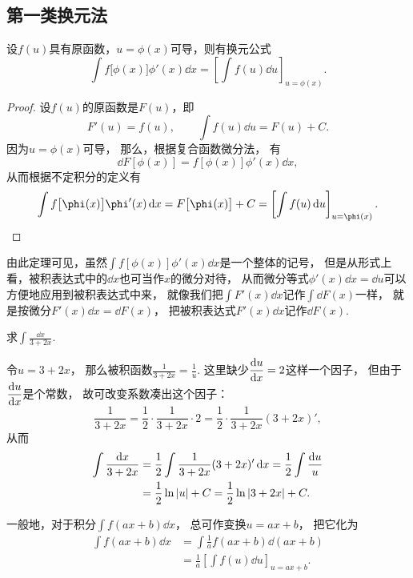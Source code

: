 \subsection{第一类换元法}
\begin{theorem}
设\(f(u)\)具有原函数，\(u=\phi(x)\)可导，则有换元公式\[
	\int f\bigl[\phi(x)\bigr] \phi'(x) \dd{x}
	= \left[ \int f(u) \dd{u} \right]_{u=\phi(x)}.
\]
\begin{proof}
设\(f(u)\)的原函数是\(F(u)\)，即\[
	F'(u) = f(u),
	\qquad
	\int f(u) \dd{u} = F(u) + C.
\]
因为\(u = \phi(x)\)可导，
那么，根据复合函数微分法，
有\[
	\dd{F\left[\phi(x)\right]} = f\left[\phi(x)\right] \phi'(x) \dd{x},
\]
从而根据不定积分的定义有\[
	\int f\bigl[\phi(x)\bigr] \phi'(x) \dd{x}
	= F\bigl[\phi(x)\bigr] + C
	= \left[ \int f(u) \dd{u} \right]_{u=\phi(x)}.
	\qedhere
\]
\end{proof}
\end{theorem}

由此定理可见，虽然\(\int f[\phi(x)] \phi'(x) \dd{x}\)是一个整体的记号，
但是从形式上看，被积表达式中的\(\dd{x}\)也可当作\(x\)的微分对待，
从而微分等式\(\phi'(x) \dd{x} = \dd{u}\)可以方便地应用到被积表达式中来，
就像我们把\(\int F'(x) \dd{x}\)记作\(\int \dd{F(x)}\)一样，
就是按微分\(F'(x) \dd{x} = \dd{F(x)}\)，
把被积表达式\(F'(x) \dd{x}\)记作\(\dd{F(x)}\).

\begin{example}
求\(\int \frac{\dd{x}}{3+2x}\).
\begin{solution}
令\(u = 3+2x\)，
那么被积函数\(\frac{1}{3+2x} = \frac{1}{u}\).
这里缺少\(\displaystyle\dv{u}{x}=2\)这样一个因子，
但由于\(\displaystyle\dv{u}{x}\)是个常数，
故可改变系数凑出这个因子：\[
	\frac{1}{3+2x}
	= \frac{1}{2} \cdot \frac{1}{3+2x} \cdot 2
	= \frac{1}{2} \cdot \frac{1}{3+2x} (3+2x)',
\]
从而\begin{align*}
	\int \frac{\dd{x}}{3+2x}
	&= \frac{1}{2} \int \frac{1}{3+2x} (3+2x)' \dd{x}
	= \frac{1}{2} \int \frac{\dd{u}}{u} \\
	&= \frac{1}{2} \ln\abs{u} + C
	= \frac{1}{2} \ln\abs{3+2x} + C.
\end{align*}
\end{solution}
\end{example}

\begin{remark}
一般地，对于积分\(\int f(ax+b) \dd{x}\)，
总可作变换\(u=ax+b\)，
把它化为\begin{align*}
	\int f(ax+b) \dd{x}
	&= \int \frac{1}{a} f(ax+b) \dd(ax+b) \\
	&= \frac{1}{a} \left[ \int f(u) \dd{u} \right]_{u=ax+b}.
\end{align*}
\end{remark}

